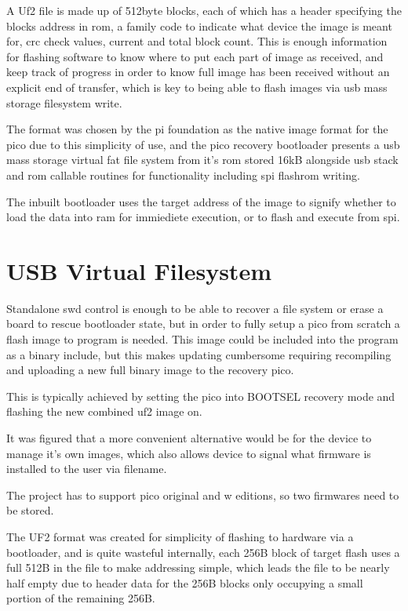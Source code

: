 A Uf2 file is made up of 512byte blocks, each of which has a header specifying the blocks address in \gls{rom}, a family code to indicate what device the image is meant for, \gls{crc} check values, current and total block count. This is enough information for flashing software to know where to put each part of image as received, and keep track of progress in order to know full image has been received without an explicit end of transfer, which is key to being able to flash images via \gls{usb} mass storage filesystem write.

The format was chosen by the pi foundation as the native image format for the pico due to this simplicity of use, and the pico recovery bootloader presents a \gls{usb} mass storage virtual \gls{fat} file system from it's \gls{rom} stored 16kB alongside \gls{usb} stack and \gls{rom} callable routines for functionality including \gls{spi} flashrom writing.

The inbuilt bootloader uses the target address of the image to signify whether to load the data into ram for immiediete execution, or to flash and execute from \gls{spi}.

\pagebreak
\section{USB Virtual Filesystem}
Standalone \gls{swd} control is enough to be able to recover a file system or erase a board to rescue bootloader state, but in order to fully setup a pico from scratch a flash image to program is needed. This image could be included into the program as a binary include, but this makes updating cumbersome requiring recompiling and uploading a new full binary image to the recovery pico.

This is typically achieved by setting the pico into BOOTSEL recovery mode and flashing the new combined uf2 image on.

It was figured that a more convenient alternative would be for the device to manage it's own images, which also allows device to signal what firmware is installed to the user via filename.

The project has to support pico original and w editions, so two firmwares need to be stored.

The UF2 format was created for simplicity of flashing to hardware via a bootloader, and is quite wasteful internally, each 256B block of target flash uses a full 512B in the file to make addressing simple, which leads the file to be nearly half empty due to header data for the 256B blocks only occupying a small portion of the remaining 256B.

